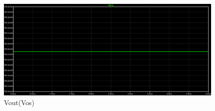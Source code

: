 \documentclass[11pt, a4paper]{article}
\begin{document}
\begin{figure}[h!]
    \centering
    \includegraphics[scale=0.4]{Imagenes/2Vo_Ios_CC.png}
    \caption{Vout(Vos)}
    \label{fig:enter-label}
\end{figure}
\end{document}
